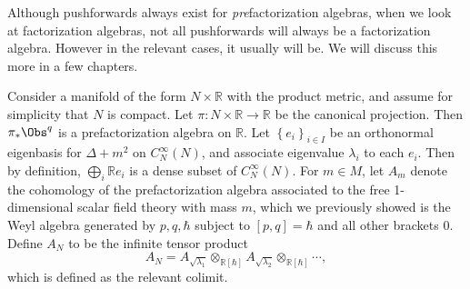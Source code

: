 \begin{warning}\label{warn:4-4-2}
	Although pushforwards always exist for \emph{pre}factorization algebras, when we look at factorization algebras, not all pushforwards will always be a factorization algebra. However in the relevant cases, it usually will be. We will discuss this more in a few chapters.
\end{warning}

Consider a manifold of the form $N\times \mathbb{R} $ with the product metric, and assume for simplicity that $N$ is compact. Let $\pi : N\times \mathbb{R}  \to \mathbb{R} $ be the canonical projection. Then $\pi _*\Obs^{q} $ is a prefactorization algebra on $\mathbb{R} $. Let $\left\{ e_i \right\} _{i\in I} $ be an orthonormal eigenbasis for $\Delta +m^2$ on $C^\infty _N(N)$, and associate eigenvalue $\lambda _i$ to each $e_i$. Then by definition, $\bigoplus_{i} \mathbb{R} e_i$ is a dense subset of $C^\infty _N(N)$. For $m\in M$, let $A_m$ denote the cohomology of the prefactorization algebra associated to the free 1-dimensional scalar field theory with mass $m$, which we previously showed is the Weyl algebra generated by $p,q,\hbar $ subject to $[p,q]=\hbar $ and all other brackets 0. Define $A_N$ to be the infinite tensor product
\[
	A_N = A_{\sqrt{\lambda _1} } \otimes _{\mathbb{R} [\hbar ]} A_{\sqrt{\lambda _2} } \otimes _{\mathbb{R} [\hbar ]}\cdots ,
\]
which is defined as the relevant colimit.

